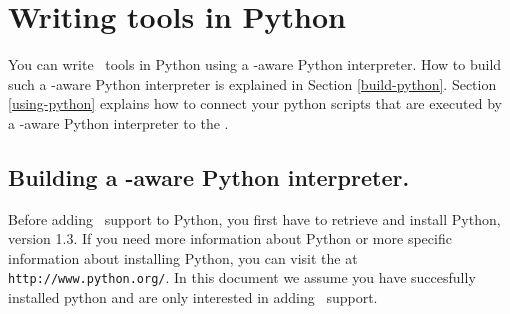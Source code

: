 
\section{\label{ToolsInPython}Writing tools in Python}

You can write \TB\ tools in Python using a \TB -aware Python interpreter.
How to build such a \TB -aware Python interpreter is explained in
Section \ref{build-python}. Section \ref{using-python} explains how
to connect your python scripts that are executed by a \TB -aware
Python interpreter to the \TB.

\subsection{\label{build-python}Building a \TB -aware Python interpreter.}

Before adding \TB\ support to Python, you first have to retrieve and
install Python, version 1.3. 
If you need more information about Python or more
specific information about installing Python, you can visit the
 at {\tt http://www.python.org/}. In this document
we assume you have succesfully installed python and are only interested
in adding \TB\ support.

